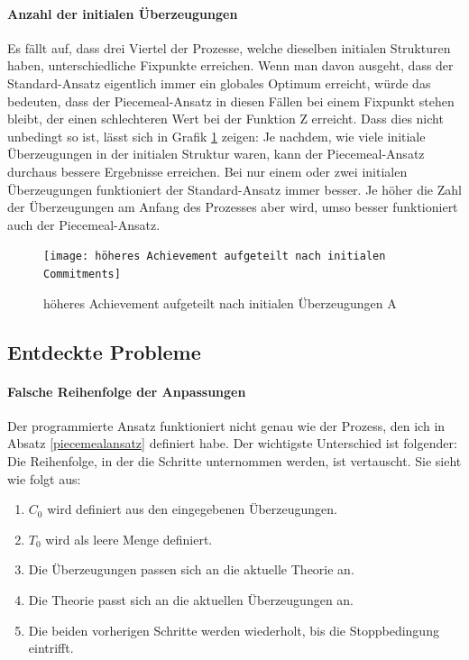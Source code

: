 \documentclass{article}
\begin{document}
\paragraph{Anzahl der initialen Überzeugungen} Es fällt auf, dass drei Viertel der Prozesse, welche dieselben initialen Strukturen haben, unterschiedliche Fixpunkte erreichen. Wenn man davon ausgeht, dass der Standard-Ansatz eigentlich immer ein globales Optimum erreicht, würde das bedeuten, dass der Piecemeal-Ansatz in diesen Fällen bei einem Fixpunkt stehen bleibt, der einen schlechteren Wert bei der Funktion Z erreicht. Dass dies nicht unbedingt so ist, lässt sich in Grafik \ref{fig:höheres Achievement aufgeteilt nach initialen Commitments} zeigen: Je nachdem, wie viele initiale Überzeugungen in der initialen Struktur waren, kann der Piecemeal-Ansatz durchaus bessere Ergebnisse erreichen. Bei nur einem oder zwei initialen Überzeugungen funktioniert der Standard-Ansatz immer besser. Je höher die Zahl der Überzeugungen am Anfang des Prozesses aber wird, umso besser funktioniert auch der Piecemeal-Ansatz.
\begin{figure}[ht]
  \centering
  \texttt{[image: höheres Achievement aufgeteilt nach initialen Commitments]}
  \caption{höheres Achievement aufgeteilt nach initialen Überzeugungen A\label{fig:höheres Achievement aufgeteilt nach initialen Commitments}}
\end{figure}

\subsection{Entdeckte Probleme} \label{found problems}
\paragraph{Falsche Reihenfolge der Anpassungen} Der programmierte Ansatz funktioniert nicht genau wie der Prozess, den ich in Absatz \ref{piecemealansatz} definiert habe. Der wichtigste Unterschied ist folgender: Die Reihenfolge, in der die Schritte unternommen werden, ist vertauscht. Sie sieht wie folgt aus:
\begin{enumerate}
    \item $C_0$ wird definiert aus den eingegebenen Überzeugungen.
    \item $T_0$ wird als leere Menge definiert.
    \item Die Überzeugungen passen sich an die aktuelle Theorie an.
    \item Die Theorie passt sich an die aktuellen Überzeugungen an.
    \item Die beiden vorherigen Schritte werden wiederholt, bis die Stoppbedingung eintrifft.
\end{enumerate}
\end{document}
